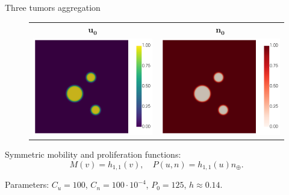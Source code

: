 \begin{frame}{Three tumors aggregation}
	\begin{figure}
		\centering
		\begin{tabular}{cc}
			\hspace*{-0.9cm}$\boldsymbol{u_0}$ & \hspace*{-0.9cm}$\boldsymbol{n_0}$\\
			\includegraphics[scale=0.2]{img/three_tumors/initial_cond/tumor_DG-UPW_Pi1_u_i-0_cropped.png} &
			\includegraphics[scale=0.2]{img/three_tumors/initial_cond/tumor_DG-UPW_Pi1_n_i-0_cropped.png}
		\end{tabular}
	\end{figure}

	Symmetric mobility and proliferation functions:
	$$
	M(v)=h_{1,1}(v),\quad P(u,n)=h_{1,1}(u)n_\oplus.
	$$

	Parameters: $C_u=100$, $C_n=100\cdot 10^{-4}$, $P_0=125$,  $h\approx 0.14$.
\end{frame}

